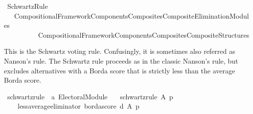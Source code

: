 %
\begin{isabellebody}%
%
%
\isadelimdocument
\isanewline
%
\endisadelimdocument
%
\isatagdocument
\isanewline
%
\isamarkuptrue%
%
\endisatagdocument
{\isafolddocument}%
%
\isadelimdocument
%
\endisadelimdocument
%
\isadelimtheory
%
\endisadelimtheory
%
\isatagtheory
{}\isamarkupfalse%
\ Schwartz{\isacharunderscore}{\kern0pt}Rule\isanewline
\ \ \ {\isachardoublequoteopen}{\isachardot}{\kern0pt}{\isachardot}{\kern0pt}{\isacharslash}{\kern0pt}Compositional{\isacharunderscore}{\kern0pt}Framework{\isacharslash}{\kern0pt}Components{\isacharslash}{\kern0pt}Composites{\isacharslash}{\kern0pt}Composite{\isacharunderscore}{\kern0pt}Elimination{\isacharunderscore}{\kern0pt}Modules{\isachardoublequoteclose}\isanewline
\ \ \ \ \ \ \ \ \ \ {\isachardoublequoteopen}{\isachardot}{\kern0pt}{\isachardot}{\kern0pt}{\isacharslash}{\kern0pt}Compositional{\isacharunderscore}{\kern0pt}Framework{\isacharslash}{\kern0pt}Components{\isacharslash}{\kern0pt}Composites{\isacharslash}{\kern0pt}Composite{\isacharunderscore}{\kern0pt}Structures{\isachardoublequoteclose}\isanewline
\isanewline
{}%
\endisatagtheory
{\isafoldtheory}%
%
\isadelimtheory
%
\endisadelimtheory
%
\begin{isamarkuptext}%
This is the Schwartz voting rule. Confusingly, it is sometimes also referred as
Nanson's rule. The Schwartz rule proceeds as in the classic Nanson's rule, but
excludes alternatives with a Borda score that is strictly less than the
average Borda score.%
\end{isamarkuptext}\isamarkuptrue%
%
\isadelimdocument
%
\endisadelimdocument
%
\isatagdocument
%
\isamarkuptrue%
%
\endisatagdocument
{\isafolddocument}%
%
\isadelimdocument
%
\endisadelimdocument
{}\isamarkupfalse%
\ schwartz{\isacharunderscore}{\kern0pt}rule\ {\isacharcolon}{\kern0pt}{\isacharcolon}{\kern0pt}\ {\isachardoublequoteopen}{\isacharprime}{\kern0pt}a\ Electoral{\isacharunderscore}{\kern0pt}Module{\isachardoublequoteclose}\ \isanewline
\ \ {\isachardoublequoteopen}schwartz{\isacharunderscore}{\kern0pt}rule\ A\ p\ {\isacharequal}{\kern0pt}\isanewline
\ \ \ \ {\isacharparenleft}{\kern0pt}{\isacharparenleft}{\kern0pt}less{\isacharunderscore}{\kern0pt}average{\isacharunderscore}{\kern0pt}eliminator\ borda{\isacharunderscore}{\kern0pt}score{\isacharparenright}{\kern0pt}\ {\isasymcirclearrowleft}\isactrlsub {\isasymexists}\isactrlsub {\isacharbang}{\kern0pt}\isactrlsub d{\isacharparenright}{\kern0pt}\ A\ p{\isachardoublequoteclose}\isanewline
%
\isadelimtheory
\isanewline
%
\endisadelimtheory
%
\isatagtheory
{}\isamarkupfalse%
%
\endisatagtheory
{\isafoldtheory}%
%
\isadelimtheory
%
\endisadelimtheory
%
\end{isabellebody}%
\endinput
